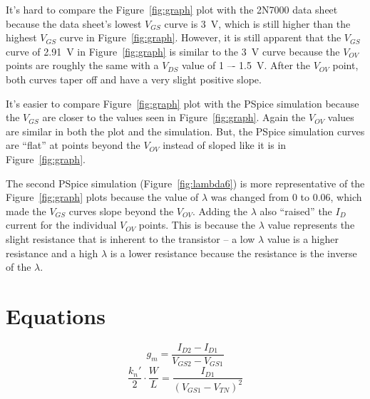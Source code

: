 It’s hard to compare the Figure~\ref{fig:graph} plot with the 2N7000 data sheet because the data sheet’s lowest $V_{GS}$ curve is \SI{3}{V}, which is still higher than the highest $V_{GS}$ curve in Figure~\ref{fig:graph}. However, it is still apparent that the $V_{GS}$ curve of \SI{2.91}{V} in Figure~\ref{fig:graph} is similar to the \SI{3}{V} curve because the $V_{OV}$ points are roughly the same with a $V_{DS}$ value of 1 –- \SI{1.5}{V}. After the $V_{OV}$ point, both curves taper off and have a very slight positive slope.

It’s easier to compare Figure~\ref{fig:graph} plot with the PSpice simulation because the $V_{GS}$ are closer to the values seen in Figure~\ref{fig:graph}. Again the $V_{OV}$ values are similar in both the plot and the simulation. But, the PSpice simulation curves are “flat” at points beyond the $V_{OV}$ instead of sloped like it is in Figure~\ref{fig:graph}.

The second PSpice simulation (Figure~\ref{fig:lambda6}) is more representative of the Figure~\ref{fig:graph} plots because the value of $\lambda$ was changed from 0 to 0.06, which made the $V_{GS}$ curves slope beyond the $V_{OV}$. Adding the $\lambda$ also “raised” the $I_D$ current for the individual $V_{OV}$ points. This is because the $\lambda$ value represents the slight resistance that is inherent to the transistor – a low $\lambda$ value is a higher resistance and a high $\lambda$ is a lower resistance because the resistance is the inverse of the $\lambda$.

\section{Equations}
\label{sec:equations}

%
\begin{equation}
  \label{eq:transconduct}
  g_m = \frac{I_{D2}-I_{D1}}{V_{GS2}-V_{GS1}}
\end{equation}
%
\begin{equation}
  \label{eq:phys}
  \frac{k_n'}{2} \cdot \frac{W}{L} = \frac{I_{D1}}{(V_{GS1} - V_{TN})^2}
\end{equation}


